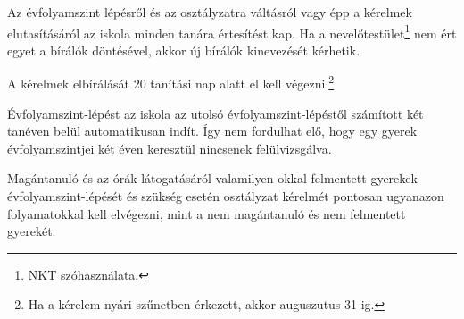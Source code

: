 Az évfolyamszint lépésről és az osztályzatra váltásról vagy épp a kérelmek
elutasításáról az iskola minden tanára értesítést kap. Ha a
nevelőtestület\footnote{NKT szóhasználata.}
nem ért egyet a bírálók döntésével, akkor új bírálók kinevezését kérhetik.

A kérelmek elbírálását 20 tanítási nap alatt el kell végezni.\footnote{Ha a
    kérelem nyári szűnetben érkezett, akkor auguszutus 31-ig.}

Évfolyamszint-lépést az iskola az utolsó évfolyamszint-lépéstől számított két
tanéven belül automatikusan indít. Így nem fordulhat elő, hogy egy gyerek
évfolyamszintjei két éven keresztül nincsenek felülvizsgálva.

Magántanuló és az órák látogatásáról valamilyen okkal felmentett gyerekek
évfolyamszint-lépését és szükség esetén osztályzat kérelmét pontosan ugyanazon
folyamatokkal kell elvégezni, mint a nem magántanuló és nem felmentett
gyerekét.